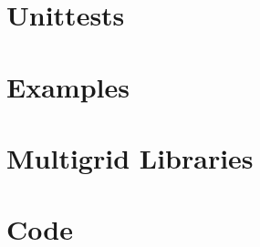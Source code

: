 \documentclass[x11names,twoside,english]{uiofysmaster}
\begin{document}
\appendix
  \chapter{Unittests}
  

  \chapter{Examples}
  


%   
\chapter{Multigrid Libraries}
  

\chapter{Code}
  


%
\end{document}
